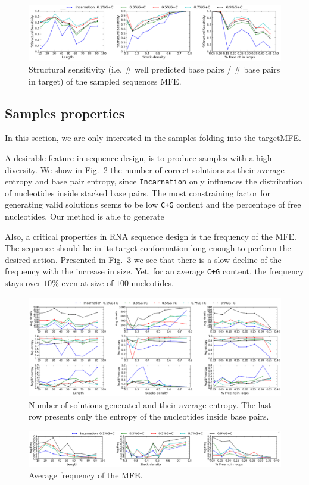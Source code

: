 \begin{figure}[ht!]
 	\centering
	\includegraphics[scale=0.45]{Figures/rnastrand_clustered_rnainverse_100samples_struct_sens.png}
	\caption{Structural sensitivity (i.e. $\#$ well predicted base pairs / $\#$ base pairs in target) of the sampled sequences MFE. }
	\label{fig:ss_sens}	
\end{figure}


\subsection{Samples properties}

In this section, we are only interested  in the samples folding into the 
targetMFE. 

A desirable feature in sequence design, is to produce samples with a high
diversity. We show in Fig.~\ref{fig:nb_sols_entropy} the number of correct
solutions as their average entropy and base pair entropy, since 
\texttt{Incarnation}  only influences the distribution of nucleotides inside 
stacked base pairs. The most constraining factor for generating valid
 solutions seems to be  low \texttt{C+G} content and the percentage of free nucleotides. Our method is able to generate 

Also, a critical properties in RNA sequence design is 
the frequency of the MFE. 
The sequence should be in its target conformation long enough to
perform the desired action. Presented in Fig.~\ref{fig:freq} we see that
there is a slow decline of the frequency with the increase in size. Yet,
for an average \texttt{C+G} content, the frequency stays over $10\%$ even
at size of $100$ nucleotides.


\begin{figure}[ht!]
	\centering
	\includegraphics[scale=0.45]{Figures/nb_sols_entropy.png}
	\caption{Number of solutions generated and their average entropy. 
	The last row presents only the entropy of the nucleotides inside base 
	pairs.}
	\label{fig:nb_sols_entropy}
\end{figure}



\begin{figure}[ht!]
	\centering
	\includegraphics[scale=0.45]{Figures/freq.png}
	\caption{Average frequency of the MFE.}
	\label{fig:freq}
\end{figure}

